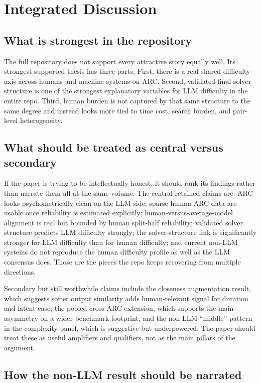 \section{Integrated Discussion}

\subsection{What is strongest in the repository}

The full repository does not support every attractive story equally well. Its strongest supported thesis has three parts. First, there is a real shared difficulty axis across humans and machine systems on ARC. Second, validated final solver structure is one of the strongest explanatory variables for LLM difficulty in the entire repo. Third, human burden is not captured by that same structure to the same degree and instead looks more tied to time cost, search burden, and pair-level heterogeneity.

\subsection{What should be treated as central versus secondary}

If the paper is trying to be intellectually honest, it should rank its findings rather than narrate them all at the same volume. The central retained claims are: ARC looks psychometrically clean on the LLM side; sparse human ARC data are usable once reliability is estimated explicitly; human-versus-average-model alignment is real but bounded by human split-half reliability; validated solver structure predicts LLM difficulty strongly; the solver-structure link is significantly stronger for LLM difficulty than for human difficulty; and current non-LLM systems do not reproduce the human difficulty profile as well as the LLM consensus does. Those are the pieces the repo keeps recovering from multiple directions.

Secondary but still worthwhile claims include the closeness augmentation result, which suggests softer output similarity adds human-relevant signal for duration and latent ease; the pooled cross-ARC extension, which supports the main asymmetry on a wider benchmark footprint; and the non-LLM ``middle'' pattern in the complexity panel, which is suggestive but underpowered. The paper should treat these as useful amplifiers and qualifiers, not as the main pillars of the argument.

\subsection{How the non-LLM result should be narrated}

